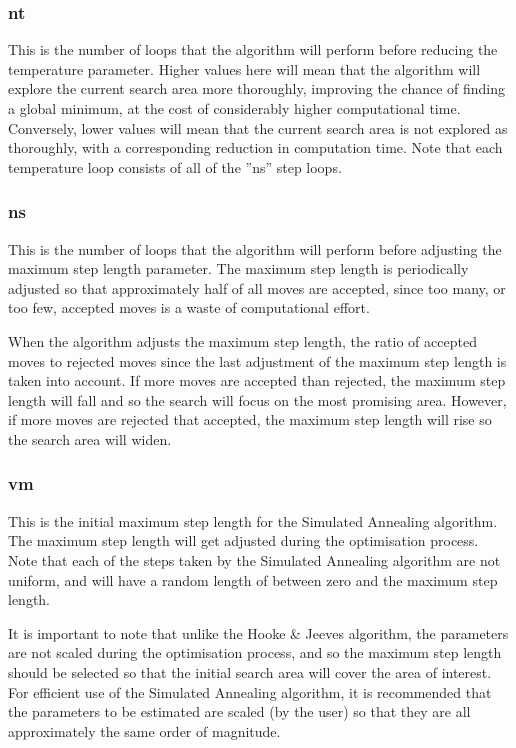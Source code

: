 \documentclass [a4paper, 10pt]{book}
\begin{document}
\subsubsection{nt}
This is the number of loops that the algorithm will perform before reducing the temperature parameter.  Higher values here will mean that the algorithm will explore the current search area more thoroughly, improving the chance of finding a global minimum, at the cost of considerably higher computational time.  Conversely, lower values will mean that the current search area is not explored as thoroughly, with a corresponding reduction in computation time.  Note that each temperature loop consists of all of the ''ns'' step loops.

\subsubsection{ns}
This is the number of loops that the algorithm will perform before adjusting the maximum step length parameter.  The maximum step length is periodically adjusted so that approximately half of all moves are accepted, since too many, or too few, accepted moves is a waste of computational effort.

\bigskip
When the algorithm adjusts the maximum step length, the ratio of accepted moves to rejected moves since the last adjustment of the maximum step length is taken into account.  If more moves are accepted than rejected, the maximum step length will fall and so the search will focus on the most promising area.  However, if more moves are rejected that accepted, the maximum step length will rise so the search area will widen.

\subsubsection{vm}
This is the initial maximum step length for the Simulated Annealing algorithm.  The maximum step length will get adjusted during the optimisation process.  Note that each of the steps taken by the Simulated Annealing algorithm are not uniform, and will have a random length of between zero and the maximum step length.

\bigskip
It is important to note that unlike the Hooke \& Jeeves algorithm, the parameters are not scaled during the optimisation process, and so the maximum step length should be selected so that the initial search area will cover the area of interest.  For efficient use of the Simulated Annealing algorithm, it is recommended that the parameters to be estimated are scaled (by the user) so that they are all approximately the same order of magnitude.
\end{document}
